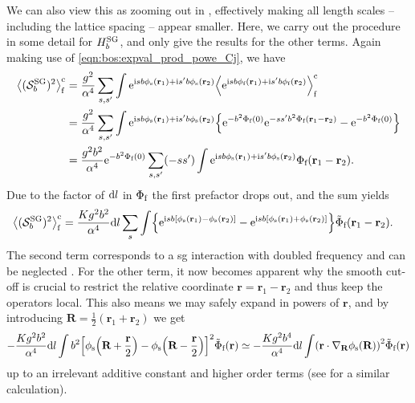 We can also view this as zooming out in \trspace{}, effectively making all length scales -- including the lattice spacing -- appear smaller. %
Here, we carry out the procedure in some detail for $H_b^{\text{SG}}$, and only give the results for the other terms.
Again making use of \autoref{eqn:bos:expval_prod_powe_Cj}, we have
\begin{align*}
\bra[\big]{(\sact_b^\tsg)^2}_\f^\c &= \frac{g^2}{\alpha^4} \sum_{s,s'} \int \powe{\i sb\phi_\s(\textbf{r}_1) + \i s'b\phi_\s(\textbf{r}_2)} \bra*{\powe{\i sb\phi_\f(\textbf{r}_1) + \i s'b\phi_\f(\textbf{r}_2)}}_\f^\c\\
&= \frac{g^2}{\alpha^4} \sum_{s,s'} \int \powe{\i sb\phi_\s(\textbf{r}_1) + \i s'b\phi_\s(\textbf{r}_2)} \klc*{\powe{-b^2 \Phi_\f(0)} \powe{-ss' b^2 \Phi_\f(\textbf{r}_1-\textbf{r}_2)} - \powe{-b^2 \Phi_\f(0)}}\\
&= \frac{g^2b^2}{\alpha^4} \powe{-b^2 \Phi_\f(0)} \sum_{s,s'} (-ss') \int \powe{\i sb\phi_\s(\textbf{r}_1) + \i s'b\phi_\s(\textbf{r}_2)} \Phi_\f(\textbf{r}_1 - \textbf{r}_2).
\end{align*}
Due to the factor of $\text{d} l$ in $\Phi_{\text{f}}$ the first prefactor drops out, and the sum yields
\begin{align*}
\bra[\big]{(\sact_b^\tsg)^2}_\f^\c &= \frac{Kg^2b^2}{\alpha^4} \d l \sum_{s} \int \klc*{\powe{\i sb\klb*{\phi_\s(\textbf{r}_1) - \phi_\s(\textbf{r}_2)}} - \powe{\i sb\klb*{\phi_\s(\textbf{r}_1) + \phi_\s(\textbf{r}_2)}}} \tilde{\Phi}_\f(\textbf{r}_1 - \textbf{r}_2).
\end{align*}
The second term corresponds to a \gls{sg} interaction with doubled frequency and can be neglected \cite[]{AltlandSimons}.
For the other term, it now becomes apparent why the smooth cut-off is crucial to restrict the relative coordinate $\textbf{r} = \textbf{r}_1 - \textbf{r}_2$ and thus keep the operators local.
This also means we may safely expand in powers of $\textbf{r}$, and by introducing $\textbf{R} = \frac{1}{2}(\textbf{r}_1 + \textbf{r}_2)$ we get
\begin{align*}
-\frac{Kg^2b^2}{\alpha^4} \d l \int b^2 \klb*{\phi_\s\kla*{\textbf{R} + \frac{\textbf{r}}{2}} - \phi_\s\kla*{\textbf{R} - \frac{\textbf{r}}{2}}}^2 \tilde{\Phi}_\f(\textbf{r}) \simeq  -\frac{Kg^2b^4}{\alpha^4} \d l \int \kla*{\textbf{r} \cdot \nabla_\textbf{R}\phi_\s(\textbf{R})}^2 \tilde{\Phi}_\f(\textbf{r})
\end{align*}
up to an irrelevant additive constant and higher order terms (see \cite[\sapp E]{Giamarchi_2004} for a similar calculation).
